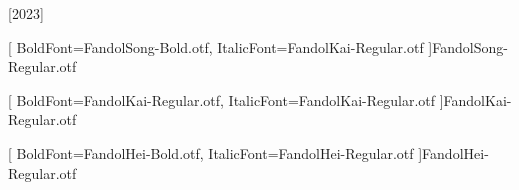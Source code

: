 [2023]


\setmainfont{Times New Roman} %
\setsansfont{TeX Gyre Heros} %




[
    BoldFont=FandolSong-Bold.otf,
    ItalicFont=FandolKai-Regular.otf
    ]{FandolSong-Regular.otf}

[
    BoldFont=FandolKai-Regular.otf,
    ItalicFont=FandolKai-Regular.otf
]{FandolKai-Regular.otf}

[
    BoldFont=FandolHei-Bold.otf,
    ItalicFont=FandolHei-Regular.otf
]{FandolHei-Regular.otf}


\newcommand\kaishu{\CJKfamily{kai}} %
\newcommand\songti{\CJKfamily{song}}
\newcommand\heiti{\CJKfamily{hei}}